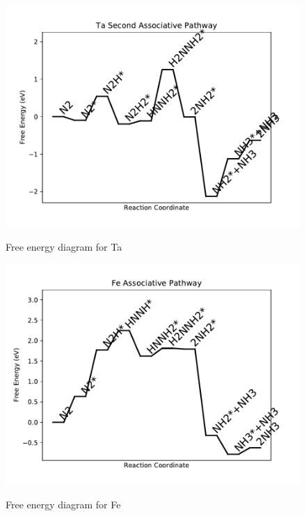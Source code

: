 \documentclass{article}
\begin{document}
\newpage
\begin{figure}
\includegraphics[width=1\linewidth]{data/plots/Ta_associative_2.pdf}
\label{fig:Ta_associative_2}
\caption{Free energy diagram for Ta}
\end{figure}

\begin{figure}
\includegraphics[width=1\linewidth]{data/plots/Fe_associative.pdf}
\label{fig:Fe_associative}
\caption{Free energy diagram for Fe}
\end{figure}
\end{document}

